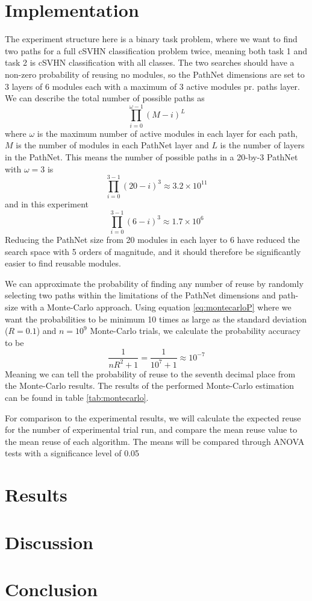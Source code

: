 \section{Implementation}
The experiment structure here is a binary task problem, where we want to find two paths for a full cSVHN classification problem twice, meaning both task 1 and task 2 is cSVHN classification with all classes. The two searches should have a non-zero probability of reusing no modules, so the PathNet dimensions are set to 3 layers of 6 modules each with a maximum of 3 active modules pr. paths layer. We can describe the total number of possible paths as 
\begin{equation*}
    \prod_{i=0}^{\omega-1}(M-i)^{L}
\end{equation*}
where \(\omega\) is the maximum number of active modules in each layer for each path, \(M\) is the number of modules in each PathNet layer and  \(L\) is the number of layers in the PathNet. This means the number of possible paths in a 20-by-3 PathNet with \(\omega=3\) is  
\begin{equation*}
    \prod_{i=0}^{3-1}(20-i)^{3}\approx 3.2\times10^{11}
\end{equation*}
and in this experiment
\begin{equation*}
    \prod_{i=0}^{3-1}(6-i)^{3}\approx 1.7\times10^{6}
\end{equation*}
Reducing the PathNet size from 20 modules in each layer to 6 have reduced the search space with 5 orders of magnitude, and it should therefore be significantly easier to find reusable modules.

We can approximate the probability of finding any number of reuse by randomly selecting two paths within the limitations of the PathNet dimensions and path-size with a Monte-Carlo approach. Using equation \ref{eq:montecarloP} where we want the probabilities to be minimum 10 times as large as the standard deviation (\(R=0.1\)) and \(n=10^{9}\) Monte-Carlo trials, we calculate the probability accuracy to be 
\begin{equation*}
    \frac{1}{nR^{2}+1}=\frac{1}{10^{7}+1}\approx10^{-7}
\end{equation*}
Meaning we can tell the probability of reuse to the seventh decimal place from the Monte-Carlo results. The results of the performed Monte-Carlo estimation can be found in table \ref{tab:montecarlo}.



For comparison to the experimental results, we will calculate the expected reuse for the number of experimental trial run, and compare the mean reuse value to the mean reuse of each algorithm. The means will be compared through ANOVA tests with a significance level of 0.05  
\section{Results}
\section{Discussion}
\section{Conclusion}
